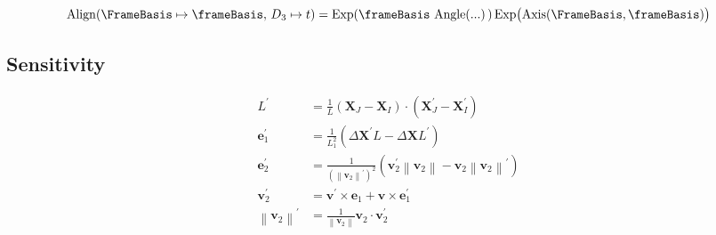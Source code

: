 $$
\operatorname{Align}(\FrameBasis \mapsto \frameBasis, \, D_3 \mapsto t)
= \operatorname{Exp}(\frameBasis\, \operatorname{Angle}(...)\, )
\operatorname{Exp}\bigl(\operatorname{Axis}(\FrameBasis, \frameBasis) \bigr)
$$



\subsection{Sensitivity}

\begin{equation}
\begin{aligned}
L^{\prime} & =\frac{1}{L}\left(\bm{X}_J-\bm{X}_I\right) \cdot\left(\bm{X}_J^{\prime}-\bm{X}_I^{\prime}\right) \\
\mathbf{e}_1^{\prime} & =\frac{1}{L_1^2}\left(\Delta \bm{X}^{\prime} L-\Delta \bm{X} L^{\prime}\right) \\
\mathbf{e}_2^{\prime} & =\frac{1}{\left(\left\|\mathbf{v}_2\right\|^{\prime}\right)^2} \left(\mathbf{v}_2^{\prime} \left\|\mathbf{v}_2\right\|-\mathbf{v}_2\left\|\mathbf{v}_2\right\|^{\prime}\right) \\
%
\mathbf{v}_2^{\prime} & =\mathbf{v}^{\prime} \times \mathbf{e}_1+\mathbf{v} \times \mathbf{e}_1^{\prime} \\
\left\|\mathbf{v}_2\right\|^{\prime} & =\frac{1}{\left\|\mathbf{v}_2\right\|}  \mathbf{v}_2 \cdot \mathbf{v}_2^{\prime}
\end{aligned}
\end{equation}

